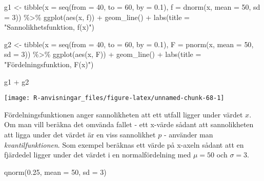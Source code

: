 \documentclass[
]{book}
\newenvironment{Shaded}{\begin{snugshade}}{\end{snugshade}}
\newcommand{\AttributeTok}[1]{\textcolor[rgb]{0.77,0.63,0.00}{#1}}
\newcommand{\DecValTok}[1]{\textcolor[rgb]{0.00,0.00,0.81}{#1}}
\newcommand{\FloatTok}[1]{\textcolor[rgb]{0.00,0.00,0.81}{#1}}
\newcommand{\FunctionTok}[1]{\textcolor[rgb]{0.00,0.00,0.00}{#1}}
\newcommand{\NormalTok}[1]{#1}
\newcommand{\OtherTok}[1]{\textcolor[rgb]{0.56,0.35,0.01}{#1}}
\newcommand{\SpecialCharTok}[1]{\textcolor[rgb]{0.00,0.00,0.00}{#1}}
\newcommand{\StringTok}[1]{\textcolor[rgb]{0.31,0.60,0.02}{#1}}
\theoremstyle{definition}
\theoremstyle{definition}
\theoremstyle{definition}
\theoremstyle{definition}
\theoremstyle{remark}
\begin{document}
\begin{Shaded}
\begin{Highlighting}[]
\NormalTok{g1 }\OtherTok{\textless{}{-}} \FunctionTok{tibble}\NormalTok{(}\AttributeTok{x =} \FunctionTok{seq}\NormalTok{(}\AttributeTok{from =} \DecValTok{40}\NormalTok{, }\AttributeTok{to =} \DecValTok{60}\NormalTok{, }\AttributeTok{by =} \FloatTok{0.1}\NormalTok{),}
             \AttributeTok{f =} \FunctionTok{dnorm}\NormalTok{(x, }\AttributeTok{mean =} \DecValTok{50}\NormalTok{, }\AttributeTok{sd =} \DecValTok{3}\NormalTok{)) }\SpecialCharTok{\%\textgreater{}\%} 
  \FunctionTok{ggplot}\NormalTok{(}\FunctionTok{aes}\NormalTok{(x, f)) }\SpecialCharTok{+} 
  \FunctionTok{geom\_line}\NormalTok{() }\SpecialCharTok{+}
  \FunctionTok{labs}\NormalTok{(}\AttributeTok{title =} \StringTok{"Sannolikhetsfunktion, f(x)"}\NormalTok{)}

\NormalTok{g2 }\OtherTok{\textless{}{-}} \FunctionTok{tibble}\NormalTok{(}\AttributeTok{x =} \FunctionTok{seq}\NormalTok{(}\AttributeTok{from =} \DecValTok{40}\NormalTok{, }\AttributeTok{to =} \DecValTok{60}\NormalTok{, }\AttributeTok{by =} \FloatTok{0.1}\NormalTok{),}
             \AttributeTok{F =} \FunctionTok{pnorm}\NormalTok{(x, }\AttributeTok{mean =} \DecValTok{50}\NormalTok{, }\AttributeTok{sd =} \DecValTok{3}\NormalTok{)) }\SpecialCharTok{\%\textgreater{}\%} 
  \FunctionTok{ggplot}\NormalTok{(}\FunctionTok{aes}\NormalTok{(x, F)) }\SpecialCharTok{+} 
  \FunctionTok{geom\_line}\NormalTok{() }\SpecialCharTok{+}
  \FunctionTok{labs}\NormalTok{(}\AttributeTok{title =} \StringTok{"Fördelningsfunktion, F(x)"}\NormalTok{)}

\NormalTok{g1 }\SpecialCharTok{+}\NormalTok{ g2}
\end{Highlighting}
\end{Shaded}

\begin{center}\texttt{[image: R-anvisningar\_files/figure-latex/unnamed-chunk-68-1]} \end{center}

Fördelningsfunktionen anger sannolikheten att ett utfall ligger under värdet \(x\). Om man vill beräkna det omvända fallet - ett x-värde sådant att sannolikheten att ligga under det värdet är en viss sannolikhet \(p\) - använder man \emph{kvantilfunktionen}. Som exempel beräknas ett värde på x-axeln sådant att en fjärdedel ligger under det värdet i en normalfördelning med \(\mu = 50\) och \(\sigma = 3\).

\begin{Shaded}
\begin{Highlighting}[]
\FunctionTok{qnorm}\NormalTok{(}\FloatTok{0.25}\NormalTok{, }\AttributeTok{mean =} \DecValTok{50}\NormalTok{, }\AttributeTok{sd =} \DecValTok{3}\NormalTok{)}
\end{Highlighting}
\end{Shaded}
\end{document}
